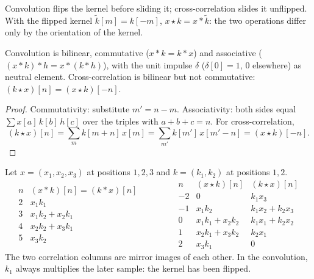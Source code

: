 \begin{notechapter}
Convolution flips the kernel before sliding it; cross-correlation slides it unflipped. With
the flipped kernel $\tilde k[m] = k[-m]$, $x\star k = x * \tilde k$: the two operations differ only by the orientation of
the kernel.

\begin{proposition}\label{convolution-filtering:prop:algebra}
Convolution is bilinear, commutative ($x * k = k * x$) and associative
($(x * k) * h = x * (k * h)$), with the unit impulse $\delta$ ($\delta[0] = 1$, $0$ elsewhere) as neutral element.
Cross-correlation is bilinear but not commutative: $(k\star x)[n] = (x\star k)[-n]$.
\end{proposition}

\begin{proof}
Commutativity: substitute $m' = n - m$. Associativity: both sides equal
$\sum x[a]\,k[b]\,h[c]$ over the triples with $a + b + c = n$. For cross-correlation,
\[
  (k\star x)[n] = \sum_mk[m + n]\,x[m] = \sum_{m'}k[m']\,x[m' - n] = (x\star k)[-n] .
\]
\end{proof}

\begin{example}\label{convolution-filtering:ex:short}
Let $x = (x_1, x_2, x_3)$ at positions $1,2,3$ and $k = (k_1, k_2)$ at positions $1,2$.
\[
  \begin{array}{c|c}
    n & (x * k)[n] = (k * x)[n]\\\hline
    2 & x_1k_1\\
    3 & x_1k_2 + x_2k_1\\
    4 & x_2k_2 + x_3k_1\\
    5 & x_3k_2
  \end{array}
  \qquad\qquad
  \begin{array}{c|c|c}
    n & (x\star k)[n] & (k\star x)[n]\\\hline
    -2 & 0 & k_1x_3\\
    -1 & x_1k_2 & k_1x_2 + k_2x_3\\
    0 & x_1k_1 + x_2k_2 & k_1x_1 + k_2x_2\\
    1 & x_2k_1 + x_3k_2 & k_2x_1\\
    2 & x_3k_1 & 0
  \end{array}
\]
The two correlation columns are mirror images of each other. In the convolution, $k_1$
always multiplies the later sample: the kernel has been flipped.
\end{example}


\end{notechapter}
